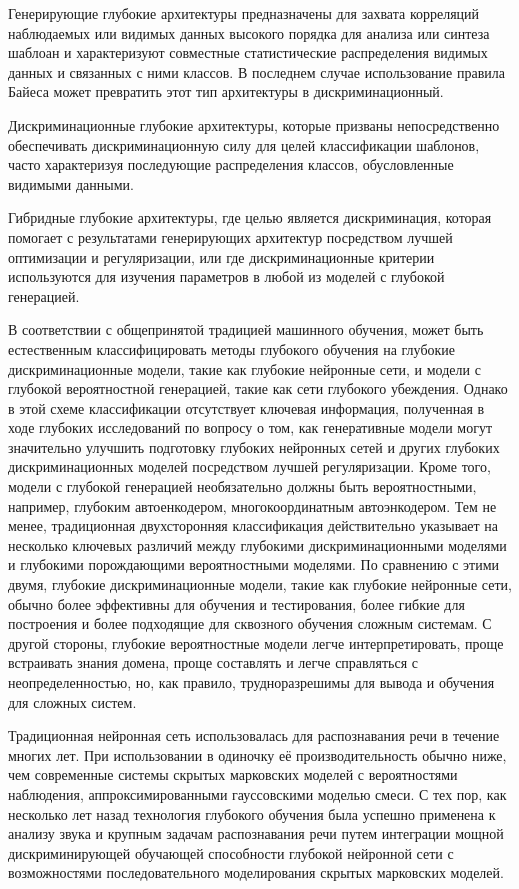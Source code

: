Генерирующие глубокие архитектуры предназначены для захвата корреляций наблюдаемых или видимых данных высокого порядка для анализа или синтеза шаблоан и характеризуют совместные статистические распределения видимых данных и связанных с ними классов. В последнем случае использование правила Байеса может превратить этот тип архитектуры в дискриминационный.

Дискриминационные глубокие архитектуры, которые призваны непосредственно обеспечивать дискриминационную силу для целей классификации шаблонов, часто характеризуя последующие распределения классов, обусловленные видимыми данными.

Гибридные глубокие архитектуры, где целью является дискриминация, которая помогает с результатами генерирующих архитектур посредством лучшей оптимизации и регуляризации, или где дискриминационные критерии используются для изучения параметров в любой из моделей с глубокой генерацией.

В соответствии с общепринятой традицией машинного обучения, может быть естественным классифицировать методы глубокого обучения на глубокие дискриминационные модели, такие как глубокие нейронные сети, и модели с глубокой вероятностной генерацией, такие как сети глубокого убеждения. Однако в этой схеме классификации отсутствует ключевая информация, полученная в ходе глубоких исследований по вопросу о том, как генеративные модели могут значительно улучшить подготовку глубоких нейронных сетей и других глубоких дискриминационных моделей посредством лучшей регуляризации. Кроме того, модели с глубокой генерацией необязательно должны быть вероятностными, например, глубоким автоенкодером, многокоординатным автоэнкодером. Тем не менее, традиционная двухсторонняя классификация действительно указывает на несколько ключевых различий между глубокими дискриминационными моделями и глубокими порождающими вероятностными моделями. По сравнению с этими двумя, глубокие дискриминационные модели, такие как глубокие нейронные сети, обычно более эффективны для обучения и тестирования, более гибкие для построения и более подходящие для сквозного обучения сложным системам. С другой стороны, глубокие вероятностные модели легче интерпретировать, проще встраивать знания домена, проще составлять и легче справляться с неопределенностью, но, как правило, трудноразрешимы для вывода и обучения для сложных систем.

Традиционная нейронная сеть использовалась для распознавания речи в течение многих лет. При использовании в одиночку её производительность обычно ниже, чем современные системы скрытых марковских моделей с вероятностями наблюдения, аппроксимированными гауссовскими моделью смеси. С тех пор, как несколько лет назад технология глубокого обучения была успешно применена к анализу звука и крупным задачам распознавания речи путем интеграции мощной дискриминирующей обучающей способности глубокой нейронной сети с возможностями последовательного моделирования скрытых марковских моделей.

